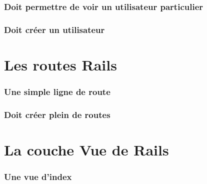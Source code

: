 \documentclass{beamer}
\begin{document}
\begin{frame}
    \frametitle{Doit permettre de voir un utilisateur particulier}
    \begin{center}
        
    \end{center}
\end{frame}

\begin{frame}
    \frametitle{Doit cr\'eer un utilisateur}
    \begin{center}
        
    \end{center}
\end{frame}

\section {Les routes Rails}

\begin{frame}
    \frametitle{Une simple ligne de route}
    \begin{center}
        
    \end{center}
\end{frame}

\begin{frame}
    \frametitle{Doit cr\'eer plein de routes}
    \begin{center}
        
    \end{center}
\end{frame}

\section {La couche Vue de Rails}

\begin{frame}
    \frametitle{Une vue d'index}
    \begin{center}
        
    \end{center}
\end{frame}
\end{document}
